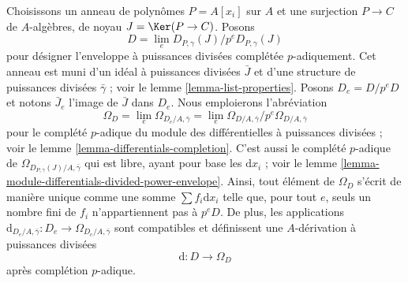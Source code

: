 \medskip\noindent
Choisissons un anneau de polynômes $P = A[x_i]$ sur $A$ et une surjection $P \to C$
de $A$-algèbres, de noyau $J = \Ker(P \to C)$. Posons
\begin{equation}
\label{equation-D}
D = \lim_e D_{P, \gamma}(J) / p^eD_{P, \gamma}(J)
\end{equation}
pour désigner l'enveloppe à puissances divisées complétée $p$-adiquement.
Cet anneau est muni d'un idéal à puissances divisées $\bar J$ et d'une structure de
puissances divisées $\bar \gamma$ ; voir le lemme \ref{lemma-list-properties}.
Posons $D_e = D/p^eD$ et notons $\bar J_e$ l'image de $\bar J$ dans $D_e$.
Nous emploierons l'abréviation
\begin{equation}
\label{equation-omega-D}
\Omega_D = \lim_e \Omega_{D_e/A, \bar\gamma} =
\lim_e \Omega_{D/A, \bar\gamma}/p^e\Omega_{D/A, \bar\gamma}
\end{equation}
pour le complété $p$-adique du module des différentielles à puissances divisées ;
voir le lemme \ref{lemma-differentials-completion}.
C'est aussi le complété $p$-adique de
$\Omega_{D_{P, \gamma}(J)/A, \bar\gamma}$
qui est libre, ayant pour base les $\text{d}x_i$ ; voir le
lemme \ref{lemma-module-differentials-divided-power-envelope}.
Ainsi, tout élément de $\Omega_D$ s'écrit de manière unique comme une somme
$\sum f_i\text{d}x_i$ telle que, pour tout $e$, seuls un nombre fini de $f_i$
n'appartiennent pas à $p^eD$. De plus, les applications
$\text{d}_{D_e/A, \bar\gamma} : D_e \to \Omega_{D_e/A, \bar\gamma}$
sont compatibles et définissent une $A$-dérivation à puissances divisées
\begin{equation}
\label{equation-derivation-D}
\text{d} : D \longrightarrow \Omega_D
\end{equation}
après complétion $p$-adique.

